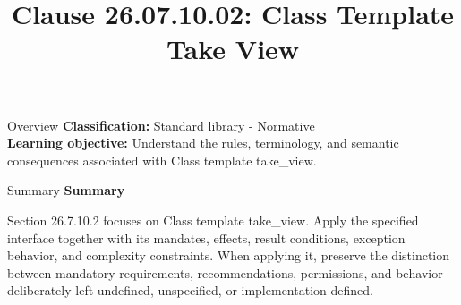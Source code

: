 \documentclass[10pt,letterpaper]{article}
\title{Clause 26.07.10.02: Class Template Take View}
\author{}
\date{}
\begin{document}
\maketitle
\begin{CornellOverviewBox}{Overview}
\textbf{Classification:} Standard library - Normative\\[2pt]
\textbf{Learning objective:} Understand the rules, terminology, and semantic consequences associated with Class template take\_view.
\end{CornellOverviewBox}\begin{CornellSummaryBox}{Summary}
{\sffamily\bfseries\color{Accent} Summary}\par\vspace{3pt}Section 26.7.10.2 focuses on Class template take\_view. Apply the specified interface together with its mandates, effects, result conditions, exception behavior, and complexity constraints. When applying it, preserve the distinction between mandatory requirements, recommendations, permissions, and behavior deliberately left undefined, unspecified, or implementation-defined.
\end{CornellSummaryBox}
\end{document}
